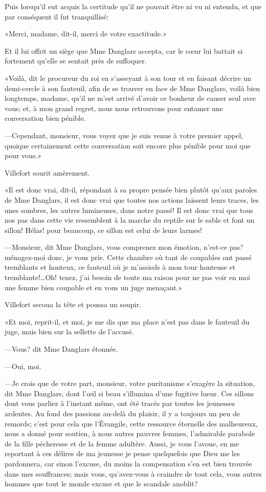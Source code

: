 Puis lorsqu'il eut acquis la certitude qu'il ne pouvait être ni vu ni entendu, et que par conséquent il fut tranquillisé: 

«Merci, madame, dit-il, merci de votre exactitude.» 

Et il lui offrit un siège que Mme Danglars accepta, car le cœur lui battait si fortement qu'elle se sentait près de suffoquer. 

«Voilà, dit le procureur du roi en s'asseyant à son tour et en faisant décrire un demi-cercle à son fauteuil, afin de se trouver en face de Mme Danglars, voilà bien longtemps, madame, qu'il ne m'est arrivé d'avoir ce bonheur de causer seul avec vous; et, à mon grand regret, nous nous retrouvons pour entamer une conversation bien pénible. 

—Cependant, monsieur, vous voyez que je suis venue à votre premier appel, quoique certainement cette conversation soit encore plus pénible pour moi que pour vous.» 

Villefort sourit amèrement. 

«Il est donc vrai, dit-il, répondant à sa propre pensée bien plutôt qu'aux paroles de Mme Danglars, il est donc vrai que toutes nos actions laissent leurs traces, les unes sombres, les autres lumineuses, dans notre passé! Il est donc vrai que tous nos pas dans cette vie ressemblent à la marche du reptile sur le sable et font un sillon! Hélas! pour beaucoup, ce sillon est celui de leurs larmes! 

—Monsieur, dit Mme Danglars, vous comprenez mon émotion, n'est-ce pas? ménagez-moi donc, je vous prie. Cette chambre où tant de coupables ont passé tremblants et honteux, ce fauteuil où je m'assieds à mon tour honteuse et tremblante!\dots Oh! tenez, j'ai besoin de toute ma raison pour ne pas voir en moi une femme bien coupable et en vous un juge menaçant.» 

Villefort secoua la tête et poussa un soupir. 

«Et moi, reprit-il, et moi, je me dis que ma place n'est pas dans le fauteuil du juge, mais bien sur la sellette de l'accusé. 

—Vous? dit Mme Danglars étonnée. 

—Oui, moi. 

—Je crois que de votre part, monsieur, votre puritanisme s'exagère la situation, dit Mme Danglars, dont l'œil si beau s'illumina d'une fugitive lueur. Ces sillons dont vous parliez à l'instant même, ont été tracés par toutes les jeunesses ardentes. Au fond des passions au-delà du plaisir, il y a toujours un peu de remords; c'est pour cela que l'Évangile, cette ressource éternelle des malheureux, nous a donné pour soutien, à nous autres pauvres femmes, l'admirable parabole de la fille pécheresse et de la femme adultère. Aussi, je vous l'avoue, en me reportant à ces délires de ma jeunesse je pense quelquefois que Dieu me les pardonnera, car sinon l'excuse, du moins la compensation s'en est bien trouvée dans mes souffrances; mais vous, qu'avez-vous à craindre de tout cela, vous autres hommes que tout le monde excuse et que le scandale anoblit? 

